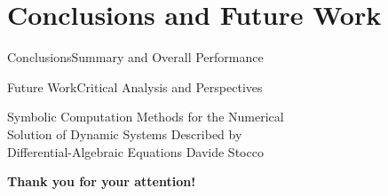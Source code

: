 
\section{Conclusions and Future Work}

\begin{frame}{Conclusions}{Summary and Overall Performance}
\end{frame}

\begin{frame}{Future Work}{Critical Analysis and Perspectives}
\end{frame}

\begin{frame}{%
  Symbolic Computation Methods for the Numerical \\
  Solution of Dynamic Systems Described by \\
  Differential-Algebraic Equations
  }{Davide Stocco}
  \vfill
  \raggedright{\selectfont\Huge\color{tx_sl_color}\bfseries{Thank you for your attention!}} \\[0.5em]
  \vfill
\end{frame}



